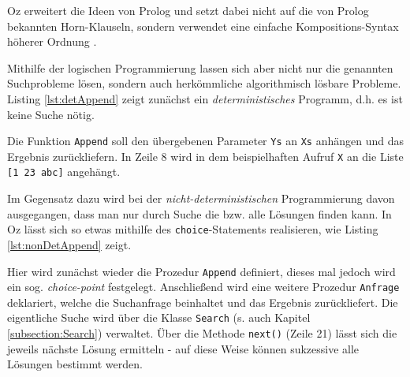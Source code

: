 Oz erweitert die Ideen von Prolog und setzt dabei nicht auf die von Prolog
bekannten Horn-Klauseln, sondern verwendet eine einfache Kompositions-Syntax
höherer Ordnung \cite{LogicProgr:2003}. 

Mithilfe der logischen Programmierung lassen sich aber nicht nur die genannten 
Suchprobleme lösen, sondern auch herkömmliche algorithmisch lösbare Probleme.
Listing \ref{lst:detAppend} zeigt zunächst ein \textsl{deterministisches}
Programm, d.h. es ist keine Suche nötig.



Die Funktion \texttt{Append} soll den übergebenen Parameter \texttt{Ys} an 
\texttt{Xs} anhängen und das Ergebnis zurückliefern. In Zeile 8 wird in dem 
beispielhaften Aufruf \texttt{X} an die Liste \texttt{[1 23 abc]} angehängt.

Im Gegensatz dazu wird bei der \textsl{nicht-deterministischen} Programmierung
davon ausgegangen, dass man nur durch Suche die bzw. alle Lösungen finden kann.
In Oz lässt sich so etwas mithilfe des \texttt{choice}-Statements realisieren,
wie Listing \ref{lst:nonDetAppend} zeigt.



Hier wird zunächst wieder die Prozedur \texttt{Append} definiert, dieses mal
jedoch wird ein sog. \textsl{choice-point} festgelegt. Anschließend wird eine
weitere Prozedur \texttt{Anfrage} deklariert, welche die Suchanfrage beinhaltet
und das Ergebnis zurückliefert. Die eigentliche Suche wird über die Klasse
\texttt{Search} (s. auch Kapitel \ref{subsection:Search}) verwaltet. Über die
Methode \texttt{next()} (Zeile 21) lässt sich die jeweils nächste Lösung
ermitteln - auf diese Weise können sukzessive alle Lösungen bestimmt werden.
